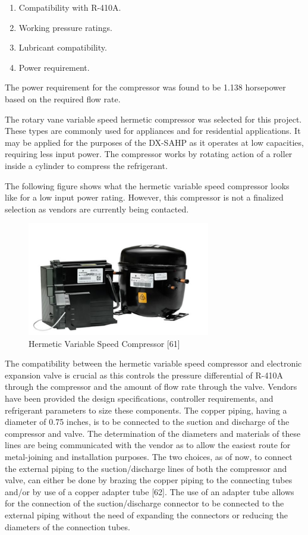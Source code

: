 \medskip
\begin{enumerate}[itemsep=3mm, parsep=-1mm, label=\roman*.]
    \item Compatibility with R-410A.
    \item Working pressure ratings.
    \item Lubricant compatibility.
    \item Power requirement.
\end{enumerate}

\medskip
The power requirement for the compressor was found to be 1.138 horsepower based on the required flow rate.

\medskip
The rotary vane variable speed hermetic compressor was selected for this project. These types are commonly used for appliances and for residential applications. It may be applied for the purposes of the DX-SAHP as it operates at low capacities, requiring less input power. The compressor works by rotating action of a roller inside a cylinder to compress the refrigerant.

\medskip
The following figure shows what the hermetic variable speed compressor looks like for a low input power rating. However, this compressor is not a finalized selection as vendors are currently being contacted.

\newpage
\begin{figure}[H]
    \centering
    \includegraphics[width=8cm]{images/var_speed_compressor.png}
    \caption{Hermetic Variable Speed Compressor [61]}
\end{figure}

\medskip
The compatibility between the hermetic variable speed compressor and electronic expansion valve is crucial as this controls the pressure differential of R-410A through the compressor and the amount of flow rate through the valve. Vendors have been provided the design specifications, controller requirements, and refrigerant parameters to size these components. The copper piping, having a diameter of 0.75 inches, is to be connected to the suction and discharge of the compressor and valve. The determination of the diameters and materials of these lines are being communicated with the vendor as to allow the easiest route for metal-joining and installation purposes. The two choices, as of now, to connect the external piping to the suction/discharge lines of both the compressor and valve, can either be done by brazing the copper piping to the connecting tubes and/or by use of a copper adapter tube [62]. The use of an adapter tube allows for the connection of the suction/discharge connector to be connected to the external piping without the need of expanding the connectors or reducing the diameters of the connection tubes.

